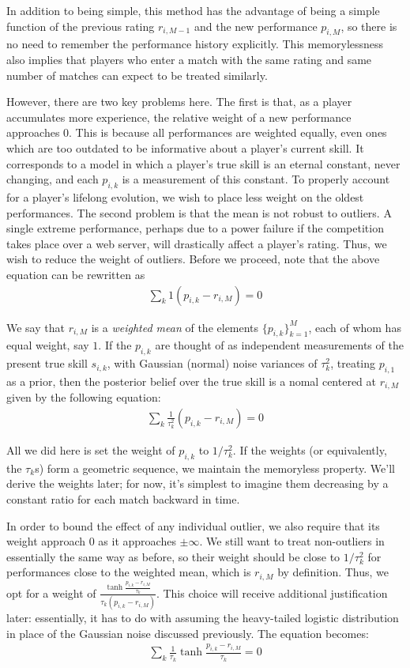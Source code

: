 \documentclass{article}
\begin{document}
In addition to being simple, this method has the advantage of being a simple function of the previous rating $r_{i,M-1}$ and the new performance $p_{i,M}$, so there is no need to remember the performance history explicitly. This memorylessness also implies that players who enter a match with the same rating and same number of matches can expect to be treated similarly.

However, there are two key problems here. The first is that, as a player accumulates more experience, the relative weight of a new performance approaches $0$. This is because all performances are weighted equally, even ones which are too outdated to be informative about a player's current skill. It corresponds to a model in which a player's true skill is an eternal constant, never changing, and each $p_{i,k}$ is a measurement of this constant. To properly account for a player's lifelong evolution, we wish to place less weight on the oldest performances. The second problem is that the mean is not robust to outliers. A single extreme performance, perhaps due to a power failure if the competition takes place over a web server, will drastically affect a player's rating. Thus, we wish to reduce the weight of outliers. Before we proceed, note that the above equation can be rewritten as
\begin{align}
\sum_k 1 (p_{i,k} - r_{i,M}) = 0
\end{align}

We say that $r_{i,M}$ is a \emph{weighted mean} of the elements $\{p_{i,k}\}_{k=1}^{M}$, each of whom has equal weight, say $1$. If the $p_{i,k}$ are thought of as independent measurements of the present true skill $s_{i,k}$, with Gaussian (normal) noise variances of $\tau_k^2$, treating $p_{i,1}$ as a prior, then the posterior belief over the true skill is a nomal centered at $r_{i,M}$ given by the following equation:
\begin{align}
\sum_k \frac{1}{\tau_k^2} (p_{i,k} - r_{i,M}) = 0
\end{align}

All we did here is set the weight of $p_{i,k}$ to $1/\tau_k^2$. If the weights (or equivalently, the $\tau_k$s) form a geometric sequence, we maintain the memoryless property. We'll derive the weights later; for now, it's simplest to imagine them decreasing by a constant ratio for each match backward in time.

In order to bound the effect of any individual outlier, we also require that its weight approach $0$ as it approaches $\pm\infty$. We still want to treat non-outliers in essentially the same way as before, so their weight should be close to $1/\tau_k^2$ for performances close to the weighted mean, which is $r_{i,M}$ by definition. Thus, we opt for a weight of $\frac{\tanh\frac{p_{i,k} - r_{i,M}}{\tau_k}}{\tau_k(p_{i,k} - r_{i,M})}$. This choice will receive additional justification later: essentially, it has to do with assuming the heavy-tailed logistic distribution in place of the Gaussian noise discussed previously. The equation becomes:
\begin{align}
\sum_k \frac {1}{\tau_k} \tanh\frac{p_{i,k} - r_{i,M}}{\tau_k} = 0
\end{align}
\end{document}
